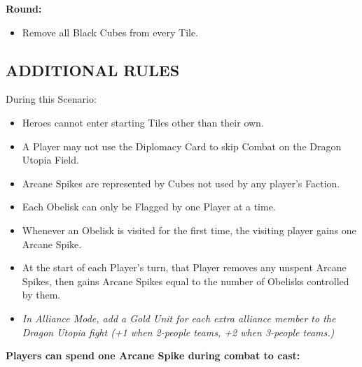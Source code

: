 \begin{multicols}{2}
\textbf{ Round:}
\begin{itemize}
  \item Remove all Black Cubes from every Tile.
\end{itemize}

\subsection*{\MakeUppercase{Additional Rules}}

During this Scenario:

\begin{itemize}
  \item Heroes cannot enter starting Tiles other than their own.
  \item A Player may not use the Diplomacy Card to skip Combat on the Dragon Utopia Field.
  \item Arcane Spikes are represented by Cubes not used by any player's Faction.
  \item Each Obelisk can only be Flagged by one Player at a time.
  \item Whenever an Obelisk is visited for the first time, the visiting player gains one Arcane Spike.
  \item At the start of each Player's turn, that Player removes any unspent Arcane Spikes, then gains Arcane Spikes equal to the number of Obelisks controlled by them.
  \item \textit{In Alliance Mode, add a Gold Unit for each extra alliance member to the Dragon Utopia fight (+1 when 2-people teams, +2 when 3-people teams.)}
\end{itemize}

\vspace{3em}

\begin{center}
\end{center}

\textbf{Players can spend one Arcane Spike during combat to cast:}



\end{multicols}
